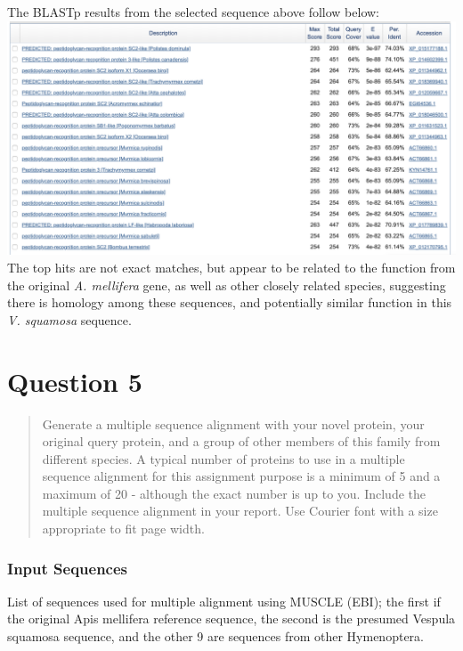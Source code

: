 \documentclass[]{article}
\begin{document}
The BLASTp results from the selected sequence above follow below:
\includegraphics{q4.png} The top hits are not exact matches, but appear
to be related to the function from the original \emph{A. mellifera}
gene, as well as other closely related species, suggesting there is
homology among these sequences, and potentially similar function in this
\emph{V. squamosa} sequence.

\section{Question 5}\label{question-5}

\begin{quote}
Generate a multiple sequence alignment with your novel protein, your
original query protein, and a group of other members of this family from
different species. A typical number of proteins to use in a multiple
sequence alignment for this assignment purpose is a minimum of 5 and a
maximum of 20 - although the exact number is up to you. Include the
multiple sequence alignment in your report. Use Courier font with a size
appropriate to fit page width.
\end{quote}

\subsubsection{Input Sequences}\label{input-sequences}

List of sequences used for multiple alignment using MUSCLE (EBI); the
first if the original Apis mellifera reference sequence, the second is
the presumed Vespula squamosa sequence, and the other 9 are sequences
from other Hymenoptera.
\end{document}
